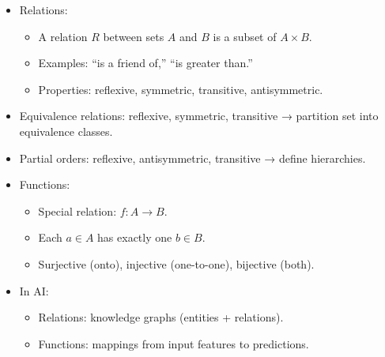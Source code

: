 \documentclass[
  letterpaper,
  DIV=11,
  numbers=noendperiod]{scrreprt}
\providecommand{\tightlist}{%
  \setlength{\itemsep}{0pt}\setlength{\parskip}{0pt}}
\begin{document}
\begin{itemize}
\item
  Relations:

  \begin{itemize}
  \tightlist
  \item
    A relation \(R\) between sets \(A\) and \(B\) is a subset of
    \(A \times B\).
  \item
    Examples: ``is a friend of,'' ``is greater than.''
  \item
    Properties: reflexive, symmetric, transitive, antisymmetric.
  \end{itemize}
\item
  Equivalence relations: reflexive, symmetric, transitive → partition
  set into equivalence classes.
\item
  Partial orders: reflexive, antisymmetric, transitive → define
  hierarchies.
\item
  Functions:

  \begin{itemize}
  \tightlist
  \item
    Special relation: \(f: A \to B\).
  \item
    Each \(a \in A\) has exactly one \(b \in B\).
  \item
    Surjective (onto), injective (one-to-one), bijective (both).
  \end{itemize}
\item
  In AI:

  \begin{itemize}
  \tightlist
  \item
    Relations: knowledge graphs (entities + relations).
  \item
    Functions: mappings from input features to predictions.
  \end{itemize}
\end{itemize}
\end{document}
